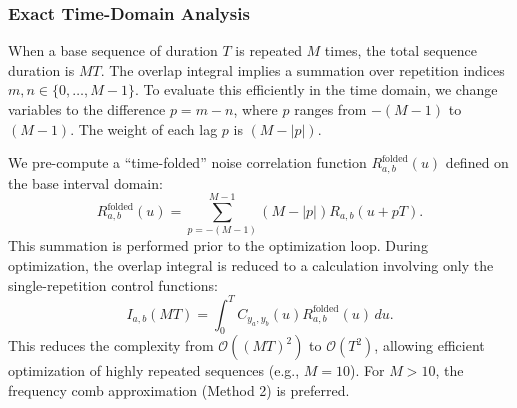 \documentclass[%
 reprint,
superscriptaddress,
 amsmath,amssymb,
 aps,
pra,
]{revtex4-2}
\begin{document}
\subsubsection{Exact Time-Domain Analysis}
When a base sequence of duration $T$ is repeated $M$ times, the total sequence duration is $MT$. The overlap integral implies a summation over repetition indices $m, n \in \{0, \dots, M-1\}$. To evaluate this efficiently in the time domain, we change variables to the difference $p = m - n$, where $p$ ranges from $-(M-1)$ to $(M-1)$. The weight of each lag $p$ is $(M - |p|)$.

We pre-compute a ``time-folded'' noise correlation function $R^{\text{folded}}_{a,b}(u)$ defined on the base interval domain:
\begin{equation}
    R^{\text{folded}}_{a,b}(u) = \sum_{p=-(M-1)}^{M-1} (M - |p|) R_{a,b}(u + pT).
\end{equation}
This summation is performed prior to the optimization loop. During optimization, the overlap integral is reduced to a calculation involving only the single-repetition control functions:
\begin{equation}
    I_{a,b}(MT) = \int_{0}^{T} C_{y_a, y_b}(u) R^{\text{folded}}_{a,b}(u) \, du.
\end{equation}
This reduces the complexity from $\mathcal{O}((MT)^2)$ to $\mathcal{O}(T^2)$, allowing efficient optimization of highly repeated sequences (e.g., $M=10$). For $M > 10$, the frequency comb approximation (Method 2) is preferred.

\end{document}
